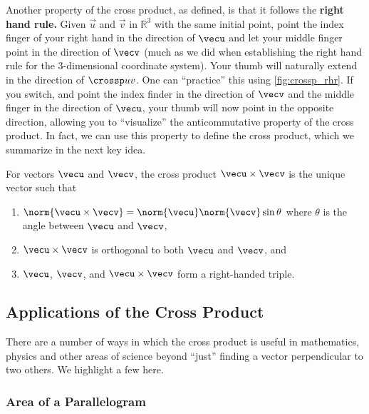 Another property of the cross product, as defined, is that it follows the \textbf{right hand rule.} Given $\vec u$ and $\vec v$ in $\mathbb{R}^3$ with the same initial point, point the index finger of your right hand in the direction of $\vecu$ and let your middle finger point in the direction of $\vecv$ (much as we did when establishing the right hand rule for the 3-dimensional coordinate system). Your thumb will naturally extend in the direction of $\crossp uv$. One can ``practice'' this using \autoref{fig:crossp_rhr}. If you switch, and point the index finder in the direction of $\vecv$ and the middle finger in the direction of $\vecu$, your thumb will now point in the opposite direction, allowing you to ``visualize'' the anticommutative property of the cross product.  In fact, we can use this property to define the cross product, which we summarize in the next key idea.

\begin{keyidea}\label{ki:cross_prod_alt}
For vectors $\vecu$ and $\vecv$, the cross product $\vecu\times\vecv$ is the unique vector such that
\begin{enumerate}
\item $\norm{\vecu\times\vecv}=\norm{\vecu}\norm{\vecv}\sin\theta$ where $\theta$ is the angle between $\vecu$ and $\vecv$,
\item $\vecu\times\vecv$ is orthogonal to both $\vecu$ and $\vecv$, 
and
\item $\vecu$, $\vecv$, and $\vecu\times\vecv$ form a right-handed triple.
\end{enumerate}
\end{keyidea}

\subsection{Applications of the Cross Product}

There are a number of ways in which the cross product is useful in mathematics, physics and other areas of science beyond ``just'' finding a vector perpendicular to two others. We highlight a few here.

\subsubsection{Area of a Parallelogram}

